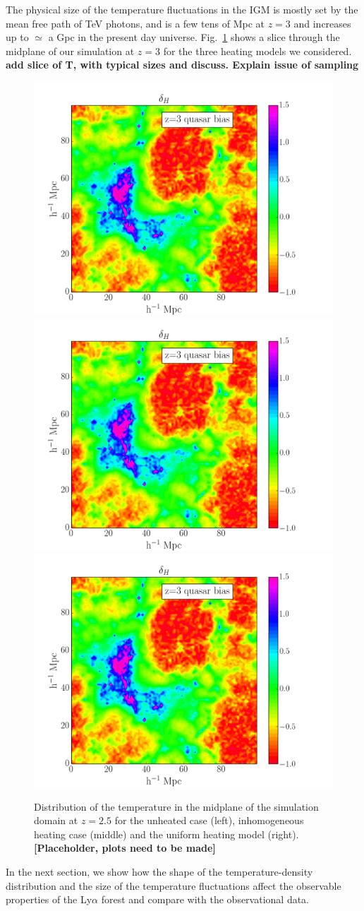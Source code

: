 \documentclass[numberedappendix]{emulateapj}
\newcommand\ALc[1]{{\color{red} \bf #1}} %
\begin{document}
The physical size of the temperature fluctuations in the IGM is mostly set by the mean free path of TeV photons, and is a few tens of Mpc at $z=3$ and increases up to $\simeq$ a Gpc in the present day universe. Fig.~\ref{fig:T_flucs} shows a slice through the midplane of our simulation at $z=3$ for the three heating models we considered. 
\ALc{add slice of T, with typical sizes and discuss. Explain issue of sampling}

\begin{figure}
\centering
\includegraphics[width = .3\textwidth ]{data_delta_z3_qso4.pdf}
\includegraphics[width = .3\textwidth ]{data_delta_z3_qso4.pdf}
\includegraphics[width = .3\textwidth ]{data_delta_z3_qso4.pdf}
\caption{Distribution of the temperature in the midplane of the simulation domain at $z=2.5$ for the unheated case (left), inhomogeneous heating case (middle) and the uniform heating model (right).\ALc{[Placeholder, plots need to be made]}}
\label{fig:T_flucs}
\end{figure}


In the next section, we show how the shape of the temperature-density distribution and the size of the temperature fluctuations affect the observable properties of the Ly$\alpha$ forest and compare with the observational data.



\end{document}
